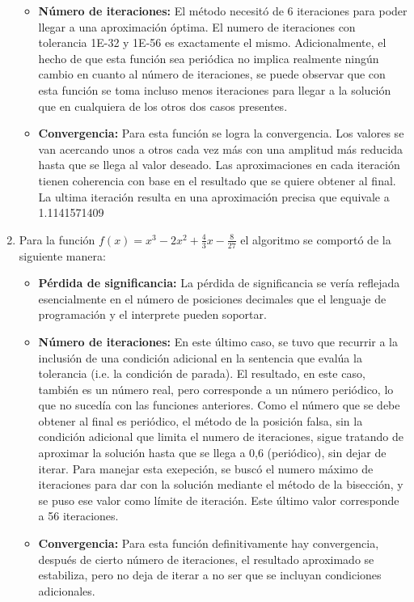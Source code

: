 \documentclass{article}
\begin{document}
\begin{enumerate}
\begin{itemize}
        \item \textbf{Número de iteraciones:}
        El método necesitó de 6 iteraciones para poder llegar a una aproximación óptima. El numero de iteraciones con tolerancia 1E-32 y 1E-56 es exactamente el mismo. Adicionalmente, el hecho de que esta función sea periódica no implica realmente ningún cambio en cuanto al número de iteraciones, se puede observar que con esta función se toma incluso menos iteraciones para llegar a la solución que en cualquiera de los otros dos casos presentes.
        \item \textbf{Convergencia:}
        Para esta función se logra la convergencia. Los valores se van acercando unos a otros cada vez más con una amplitud más reducida hasta que se llega al valor deseado. Las aproximaciones en cada iteración tienen coherencia con base en el resultado que se quiere obtener al final. La ultima iteración resulta en una aproximación precisa que equivale a 1.1141571409
    \end{itemize}
    \item Para la función \(f(x) = x^3-2x^2+\frac{4}{3}x-\frac{8}{27}\) el algoritmo se comportó de la siguiente manera:
    \begin{itemize}
        \item \textbf{Pérdida de significancia:}
        La pérdida de significancia se vería reflejada esencialmente en el número de posiciones decimales que el lenguaje de programación y el interprete pueden soportar.
        \item \textbf{Número de iteraciones:}
        En este último caso, se tuvo que recurrir a la inclusión de una condición adicional en la sentencia que evalúa la tolerancia (i.e. la condición de parada). El resultado, en este caso, también es un número real, pero corresponde a un número periódico, lo que no sucedía con las funciones anteriores. Como el número que se debe obtener al final es periódico, el método de la posición falsa, sin la condición adicional que limita el numero de iteraciones, sigue tratando de aproximar la solución hasta que se llega a 0,6 (periódico), sin dejar de iterar. Para manejar esta exepeción, se buscó el numero máximo de iteraciones para dar con la solución mediante el método de la bisección, y se puso ese valor como límite de iteración. Este último valor corresponde a 56 iteraciones. 
        \item \textbf{Convergencia:}
        Para esta función definitivamente hay convergencia, después de cierto número de iteraciones, el resultado aproximado se estabiliza, pero no deja de iterar a no ser que se incluyan condiciones adicionales.

\end{itemize}
\end{enumerate}
\end{document}
